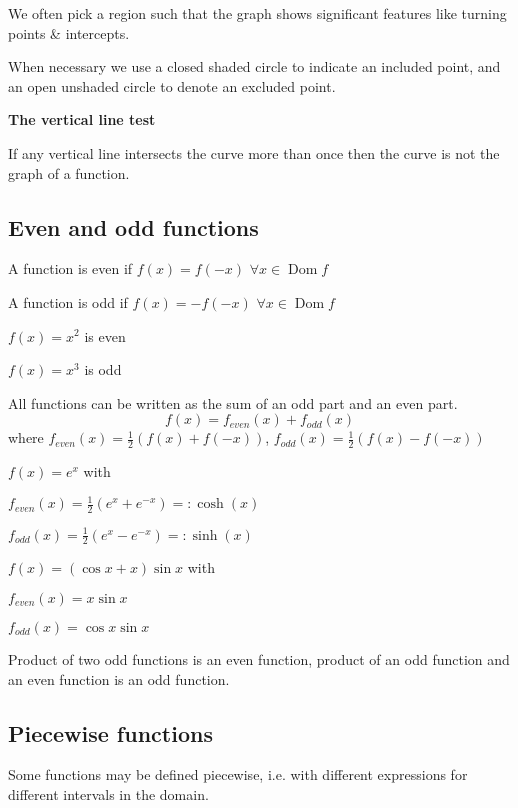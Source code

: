 \documentclass[10pt, a4paper]{article}
\DeclareMathOperator{\Dom}{Dom}
\begin{document}
We often pick a region such that the graph shows significant features like turning points \& intercepts.

When necessary we use a closed shaded circle to indicate an included point, and an open unshaded circle to denote an excluded point.

\textbf{The vertical line test}

If any vertical line intersects the curve more than once then the curve is not the graph of a function.

\subsection{Even and odd functions}
\begin{definition}
    A function is even if $f(x) = f(-x)$ $\forall x \in \Dom f$
    
    A function is odd if $f(x) = -f(-x)$ $\forall x \in \Dom f$
\end{definition}
\begin{example}
    $f(x) = x ^ 2$ is even

    $f(x) = x ^ 3$ is odd
\end{example}

All functions can be written as the sum of an odd part and an even part.
\[
f(x) = f_{even}(x) + f_{odd}(x)
\]
where $f_{even}(x) = \frac{1}{2}\left(f(x) + f(-x)\right)$,
$f_{odd}(x) = \frac{1}{2}\left(f(x) - f(-x)\right)$

\begin{example}
    $f(x) = e ^ x$ with
    
    $f_{even}(x) = \frac{1}{2}(e ^ x + e ^ {-x}) =: \cosh(x)$
    
    $f_{odd}(x) = \frac{1}{2}(e ^ x - e ^ {-x}) =: \sinh(x)$
\end{example}

\begin{example}
    $f(x) = (\cos x + x)\sin x$ with

    $f_{even}(x) = x\sin x$
    
    $f_{odd}(x) = \cos x \sin x$
\end{example}

Product of two odd functions is an even function, product of an odd function and an even function is an odd function.

\subsection{Piecewise functions}
Some functions may be defined piecewise, i.e. with different expressions for different intervals in the domain.
\end{document}
